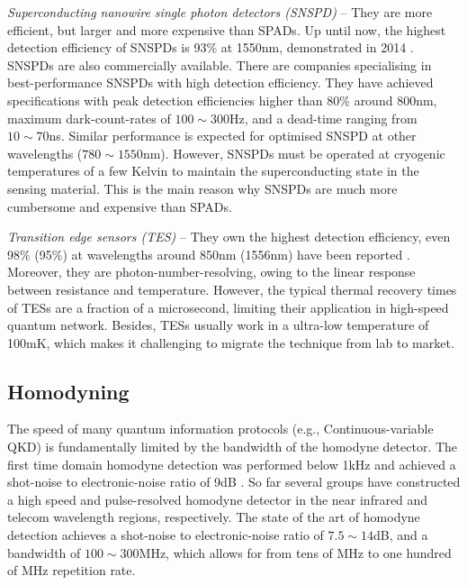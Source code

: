 \textit{Superconducting nanowire single photon detectors (SNSPD)} -- They are more efficient, but larger and more expensive than SPADs. Up until now, the highest detection efficiency of SNSPDs is 93\% at 1550nm, demonstrated in 2014 \cite{bib:marsili2013}. SNSPDs are also commercially available. There are companies specialising in best-performance SNSPDs with high detection efficiency. They have achieved specifications with peak detection efficiencies higher than 80\% around 800nm, maximum dark-count-rates of \mbox{$100\sim 300$Hz}, and a dead-time ranging from \mbox{$10\sim 70$ns}. Similar performance is expected for optimised SNSPD at other wavelengths (\mbox{$780\sim 1550$nm}). However, SNSPDs must be operated at cryogenic temperatures of a few Kelvin to maintain the superconducting state in the sensing material. This is the main reason why SNSPDs are much more cumbersome and expensive than SPADs.

\textit{Transition edge sensors (TES)} -- They own the highest detection efficiency, even 98\% (95\%) at wavelengths around 850nm (1556nm) have been reported \cite{bib:fukuda2011, bib:lita2008}. Moreover, they are photon-number-resolving, owing to the linear response between resistance and temperature. However, the typical thermal recovery times of TESs are a fraction of a microsecond, limiting their application in high-speed quantum network. Besides, TESs usually work in a ultra-low temperature of 100mK, which makes it challenging to migrate the technique from lab to market.

%
%

\subsection{Homodyning} 

The speed of many quantum information protocols (e.g., Continuous-variable QKD) is fundamentally limited by the bandwidth of the homodyne detector. The first time domain homodyne detection was performed below 1kHz and achieved a shot-noise to electronic-noise ratio of 9dB \cite{bib:winzer2010}. So far several groups \cite{bib:zavatta2002time, bib:okubo2008pulse, bib:kumar2012versatile, bib:chi2011balanced, bib:duan2013} have constructed a high speed and pulse-resolved homodyne detector in the near infrared and telecom wavelength regions, respectively. The state of the art of homodyne detection achieves a shot-noise to electronic-noise ratio of \mbox{$7.5\sim 14$dB}, and a bandwidth of \mbox{$100\sim 300$MHz}, which allows for from tens of MHz to one hundred of MHz repetition rate.

